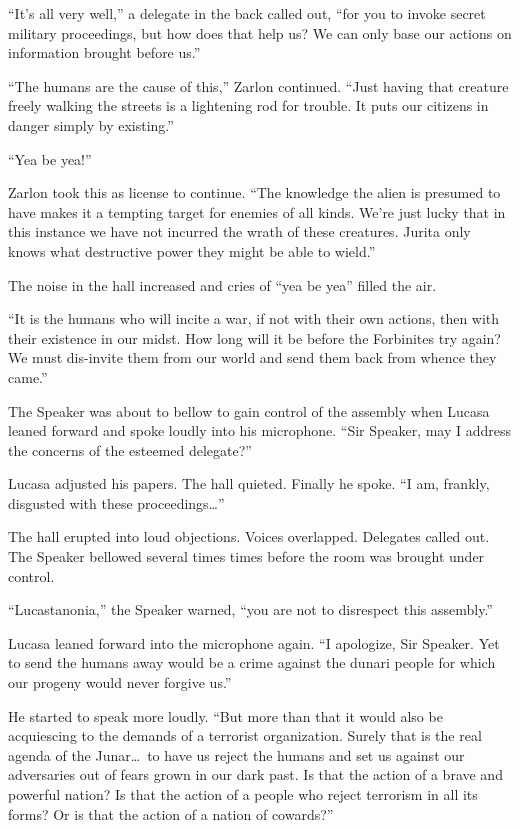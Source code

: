``It's all very well,'' a delegate in the back called out, ``for you to invoke secret military
proceedings, but how does that help us? We can only base our actions on information brought
before us.''

``The humans are the cause of this,'' Zarlon continued. ``Just having that creature freely
walking the streets is a lightening rod for trouble. It puts our citizens in danger simply by
existing.''

``Yea be yea!''

Zarlon took this as license to continue. ``The knowledge the alien is presumed to have makes it
a tempting target for enemies of all kinds. We're just lucky that in this instance we have not
incurred the wrath of these creatures. Jurita only knows what destructive power they might be
able to wield.''

The noise in the hall increased and cries of ``yea be yea'' filled the air.

``It is the humans who will incite a war, if not with their own actions, then with their
existence in our midst. How long will it be before the Forbinites try again? We must dis-invite
them from our world and send them back from whence they came.''

The Speaker was about to bellow to gain control of the assembly when Lucasa leaned forward and
spoke loudly into his microphone. ``Sir Speaker, may I address the concerns of the esteemed
delegate?''

Lucasa adjusted his papers. The hall quieted. Finally he spoke. ``I am, frankly, disgusted with
these proceedings\ldots''

The hall erupted into loud objections. Voices overlapped. Delegates called out. The Speaker
bellowed several times times before the room was brought under control.

``Lucastanonia,'' the Speaker warned, ``you are not to disrespect this assembly.''

Lucasa leaned forward into the microphone again. ``I apologize, Sir Speaker. Yet to send the
humans away would be a crime against the dunari people for which our progeny would never forgive
us.''

He started to speak more loudly. ``But more than that it would also be acquiescing to the
demands of a terrorist organization. Surely that is the real agenda of the Junar\ldots\ to have
us reject the humans and set us against our adversaries out of fears grown in our dark past. Is
that the action of a brave and powerful nation? Is that the action of a people who reject
terrorism in all its forms? Or is that the action of a nation of cowards?''

